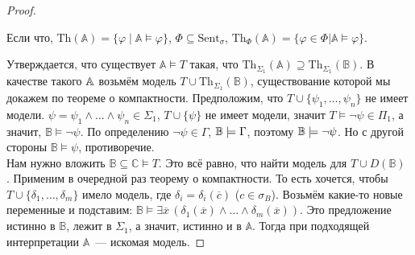 \begin{proof}
    \begin{definition}
        Если что, $\text{Th}(\mathbb{A}) = \{\varphi \mid \mathbb{A} \models \varphi\}$, $\Phi \subseteq \text{Sent}_\sigma$, $\text{Th}_{\Phi}(\mathbb{A}) = \{\varphi \in \Phi | \mathbb{A} \models \varphi\}$.
    \end{definition}
    Утверждается, что существует $\mathbb{A} \models T$ такая, что $\text{Th}_{\Sigma_1}(\mathbb{A}) \supseteq \text{Th}_{\Sigma_1}(\mathbb{B})$.
    В качестве такого ${\mathbb A}$ возьмём модель $T \cup \text{Th}_{\Sigma_1}(\mathbb{B})$, существование которой мы докажем по теореме о компактности.
    Предположим, что $T \cup \{\psi_1, \ldots, \psi_n\}$ не имеет модели. $\psi = \psi_1 \wedge \ldots \wedge \psi_n \in \Sigma_1$, $T \cup \{\psi\}$ не имеет модели, значит $T \models \neg \psi \in \Pi_1$, а значит, $\mathbb{B} \models \neg \psi$. По определению $\neg\psi\in\Gamma$, ${\mathbb B}\models\Gamma$, поэтому ${\mathbb B}\models\neg\psi$. Но с другой стороны $\mathbb{B} \models \psi$, противоречие. \\ 

    Нам нужно вложить $\mathbb{B} \subseteq \mathbb{C} \models T$. Это всё равно, что найти модель для  $T \cup D(\mathbb{B})$ . Применим в очередной раз теорему о компактности. То есть хочется, чтобы $T \cup \{\delta_1, \ldots, \delta_m\}$ имело модель, где $\delta_i = \delta_i(\overline{c})$ ($c \in \sigma_B$). Возьмём какие-то новые переменные и подставим: $\mathbb{B} \models \exists \overline{x}\, (\delta_1(\overline{x}) \wedge \ldots \wedge \delta_m(\overline{x}))$. Это предложение истинно в $\mathbb{B}$, лежит в $\Sigma_1$, а значит, истинно и в $\mathbb{A}$. Тогда при подходящей интерпретации $\mathbb{A}$~— искомая модель.
\end{proof}

